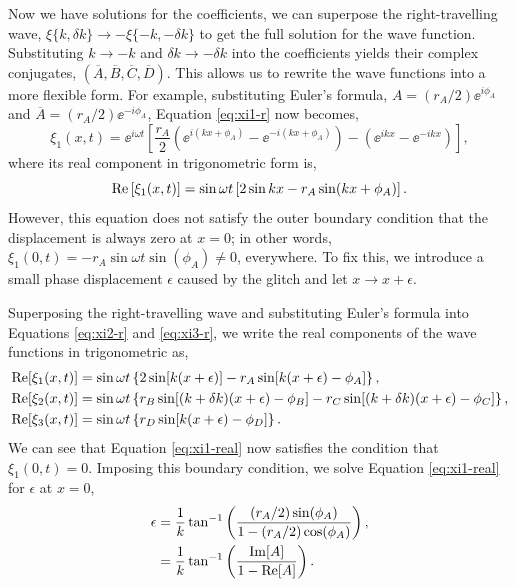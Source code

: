Now we have solutions for the coefficients, we can superpose the right-travelling wave, \(\xi\{k, \delta k\} \rightarrow - \xi\{-k, -\delta k\}\) to get the full solution for the wave function. Substituting \(k \rightarrow -k\) and \(\delta k \rightarrow -\delta k\) into the coefficients yields their complex conjugates, \((\overline{A},\overline{B},\overline{C},\overline{D})\). This allows us to rewrite the wave functions into a more flexible form. For example, substituting Euler's formula, \(A = (r_A/2) \ee^{i\phi_A}\) and \(\overline{A} = (r_A/2) \ee^{-i\phi_A}\), Equation \ref{eq:xi1-r} now becomes,
%
\begin{equation}
    \xi_1(x, t) = \ee^{i \omega t} \left[ \frac{r_A}{2} \left( \ee^{i(kx + \phi_A)} - \ee^{-i(kx + \phi_A)} \right) - \left( \ee^{ikx} - \ee^{-ikx} \right) \right], \label{eq:xi1}
\end{equation}
%
where its real component in trigonometric form is,
\begin{equation}
    {\mathrm{Re}}\left[\xi_1(x, t)\right] = \sin \omega t \left[2 \sin kx - r_A \sin(kx + \phi_A)\right].
\end{equation}
%
However, this equation does not satisfy the outer boundary condition that the displacement is always zero at \(x=0\); in other words, \(\xi_1(0, t) = - r_A \sin \omega t \sin(\phi_A) \neq 0\), everywhere. To fix this, we introduce a small phase displacement \(\epsilon\) caused by the glitch and let \(x \rightarrow x + \epsilon\).

Superposing the right-travelling wave and substituting Euler's formula into Equations \ref{eq:xi2-r} and \ref{eq:xi3-r}, we write the real components of the wave functions in trigonometric as,
%
\begin{align}
    {\mathrm{Re}}[\xi_1(x, t)] &= \sin \omega t \left\{2 \sin[k (x + \epsilon)] - r_A \sin[k(x + \epsilon) - \phi_A]\right\}, \label{eq:xi1-real} \\
    {\mathrm{Re}}[\xi_2(x, t)] &= \sin \omega t \left\{ r_B \sin[(k + \delta k)(x + \epsilon) - \phi_B] - r_C \sin[(k + \delta k)(x + \epsilon) - \phi_C]\right\}, \\
    {\mathrm{Re}}[\xi_3(x, t)] &= \sin \omega t \left\{r_D \sin[k(x + \epsilon) - \phi_D]\right\}. \label{eq:xi3-real}
\end{align}
%
We can see that Equation \ref{eq:xi1-real} now satisfies the condition that \(\xi_1(0, t) = 0\). Imposing this boundary condition, we solve Equation \ref{eq:xi1-real} for \(\epsilon\) at \(x=0\),
%
\begin{align}
    \epsilon &= \frac{1}{k} \tan^{-1}\left( \frac{(r_A / 2) \sin(\phi_A)}{1 - (r_A/2) \cos(\phi_A)} \right), \notag\\
    &= \frac{1}{k} \tan^{-1}\left( \frac{{\mathrm{Im}}[A]}{1 - {\mathrm{Re}}[A]} \right). \label{eq:1d-phase}
\end{align}
%

